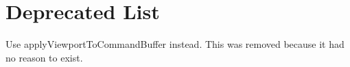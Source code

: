 \chapter{Deprecated List}
\hypertarget{deprecated}{}\label{deprecated}

\begin{DoxyRefList}
\item[Member \doxylink{class_atlas_1_1_viewport_a7fc6a46359a18372b317d97d6a3187e0}{Atlas\+::Viewport\+::Set\+Command\+Buffer\+Viewport} (Vk\+Command\+Buffer command\+Buffer, Vk\+Viewport const \texorpdfstring{$\ast$}{*}viewport)]\label{deprecated__deprecated000001}%
%
Use {\ttfamily apply\+Viewport\+To\+Command\+Buffer} instead. This was removed because it had no reason to exist.
\end{DoxyRefList}